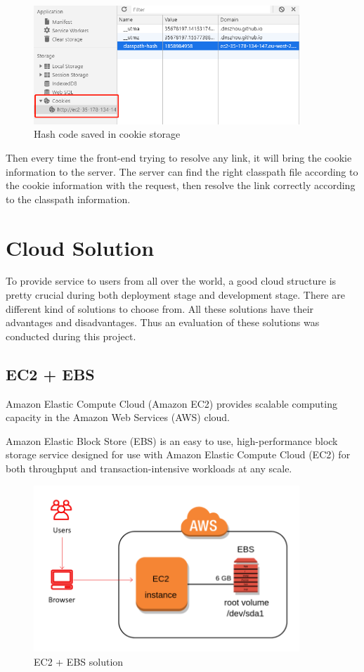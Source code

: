 \documentclass[runningheads]{llncs}
\begin{document}
\begin{figure}[H]
	\centering
	\includegraphics[width=10cm]{pic/cookie-storage.png}
	\caption{Hash code saved in cookie storage}
	\label{Hash code saved in cookie storage}
\end{figure}

Then every time the front-end trying to resolve any link, it will bring the cookie information to the server. The server can find the right classpath file according to the cookie information with the request, then resolve the link correctly according to the classpath information.

\section{Cloud Solution}

To provide service to users from all over the world, a good cloud structure is pretty crucial during both deployment stage and development stage. There are different kind of solutions to choose from. All these solutions have their advantages and disadvantages. Thus an evaluation of these solutions was conducted during this project.

\subsection{EC2 + EBS}


Amazon Elastic Compute Cloud (Amazon EC2) provides scalable computing capacity in the Amazon Web Services (AWS) cloud.\cite{AWSEC2}

Amazon Elastic Block Store (EBS) is an easy to use, high-performance block storage service designed for use with Amazon Elastic Compute Cloud (EC2) for both throughput and transaction-intensive workloads at any scale.\cite{AWSEBS}

\begin{figure}[H]
	\centering
	\includegraphics[width=10cm]{pic/ec2-ebs.png}
	\caption{EC2 + EBS solution}
	\label{EC2 + EBS solution}
\end{figure}
\end{document}
